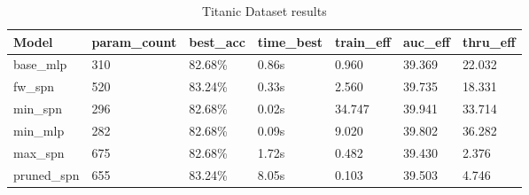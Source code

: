 \begin{table}[h!]
    \centering
    \begin{tabular}{|l|l|l|l|l|l|l|}
    \hline
    \textbf{Model} & \textbf{param\_count} & \textbf{best\_acc} & \textbf{time\_best} & \textbf{train\_eff} & \textbf{auc\_eff} & \textbf{thru\_eff} \\
    \hline
    base\_mlp & 310 & \cellcolor{red!25}82.68\% & 0.86s & 0.960 & \cellcolor{red!25}39.369 & 22.032 \\
    fw\_spn & 520 & \cellcolor{green!25}83.24\% & 0.33s & 2.560 & 39.735 & 18.331 \\
    min\_spn & 296 & \cellcolor{red!25}82.68\% & \cellcolor{green!25}0.02s & \cellcolor{green!25}34.747 & \cellcolor{green!25}39.941 & 33.714 \\
    min\_mlp & 282 & \cellcolor{red!25}82.68\% & 0.09s & 9.020 & 39.802 & \cellcolor{green!25}36.282 \\
    max\_spn & 675 & \cellcolor{red!25}82.68\% & 1.72s & 0.482 & 39.430 & \cellcolor{red!25}2.376 \\
    pruned\_spn & 655 & \cellcolor{green!25}83.24\% & \cellcolor{red!25}8.05s & \cellcolor{red!25}0.103 & 39.503 & 4.746 \\
    \hline
    \end{tabular}
    \caption{Titanic Dataset results}
    \label{tab:titanicResults}
\end{table}

